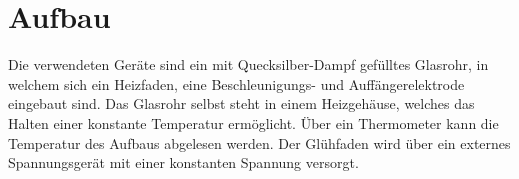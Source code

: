 \section{Aufbau}
\label{sec:Aufbau}

Die verwendeten Geräte sind ein mit Quecksilber-Dampf gefülltes Glasrohr, in welchem sich ein Heizfaden, eine Beschleunigungs- und Auffängerelektrode eingebaut sind.
Das Glasrohr selbst steht in einem Heizgehäuse, welches das Halten einer konstante Temperatur ermöglicht. Über ein Thermometer kann die Temperatur des Aufbaus abgelesen werden.
Der Glühfaden wird über ein externes Spannungsgerät mit einer konstanten Spannung versorgt.  